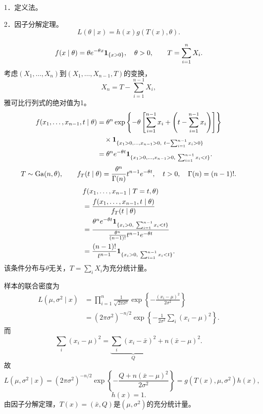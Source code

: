 1．定义法。

2．因子分解定理。
\[
L(\theta\mid x)=h(x)g(T(x),\theta).
\]

\[
f(x\mid\theta)=\theta e^{-\theta x}\mathbf{1}_{\{x>0\}},\quad\theta>0,
\qquad T=\sum_{i=1}^nX_i.
\]
考虑$(X_1,\ldots,X_n)$到$(X_1,\ldots,X_{n-1},T)$的变换，
\[
X_n=T-\sum_{i=1}^{n-1}X_i,
\]
雅可比行列式的绝对值为1。
\begin{align*}
f(x_1,\ldots,x_{n-1},t\mid\theta)
&=\theta^n
\exp\left\{-\theta\left[\sum_{i=1}^{n-1}x_i+
\left(t-\sum_{i=1}^{n-1}x_i\right)\right]\right\}\\
&\quad\times\ind_{\{x_1>0,\ldots,x_{n-1}>0,\ t-\sum_{i=1}^{n-1}x_i>0\}}\\
&=\theta^ne^{-\theta t}
\ind_{\{x_1>0,\ldots,x_{n-1}>0,\ \sum_{i=1}^{n-1}x_i<t\}}.
\end{align*}
\[
T\sim\operatorname{Ga}(n,\theta),\qquad
f_T(t\mid\theta)=\frac{\theta^n}{\Gamma(n)}t^{n-1}e^{-\theta t},
\quad t>0,\quad\Gamma(n)=(n-1)!.
\]
\begin{align*}
&f(x_1,\ldots,x_{n-1}\mid T=t,\theta)\\
&=\frac{f(x_1,\ldots,x_{n-1},t\mid\theta)}{f_T(t\mid\theta)}\\
&=\frac{\theta^ne^{-\theta t}
\mathbf{1}_{\{x_i>0,\ \sum_{i=1}^{n-1}x_i<t\}}}
{\frac{\theta^n}{(n-1)!}t^{n-1}e^{-\theta t}}\\
&=\frac{(n-1)!}{t^{n-1}}
\mathbf{1}_{\{x_i>0,\ \sum_{i=1}^{n-1}x_i<t\}}.
\end{align*}
该条件分布与$\theta$无关，$T=\sum_iX_i$为充分统计量。

样本的联合密度为
\begin{align*}
L(\mu,\sigma^2\mid x)
&=\prod_{i=1}^n\frac1{\sqrt{2\pi\sigma^2}}
\exp\left\{-\frac{(x_i-\mu)^2}{2\sigma^2}\right\}\\
&=(2\pi\sigma^2)^{-n/2}
\exp\left\{-\frac1{2\sigma^2}\sum_i(x_i-\mu)^2\right\}.
\end{align*}
而
\[
\sum_i(x_i-\mu)^2=\underbrace{\sum_i(x_i-\bar x)^2}_{Q}
+n(\bar x-\mu)^2.
\]
故
\[
L(\mu,\sigma^2\mid x)
=(2\pi\sigma^2)^{-n/2}
\exp\left\{-\frac{Q+n(\bar x-\mu)^2}{2\sigma^2}\right\}
=g(T(x),\mu,\sigma^2)h(x),
\]
\[
h(x)=1.
\]
由因子分解定理，$T(x)=(\bar x,Q)$是$(\mu,\sigma^2)$的充分统计量。

